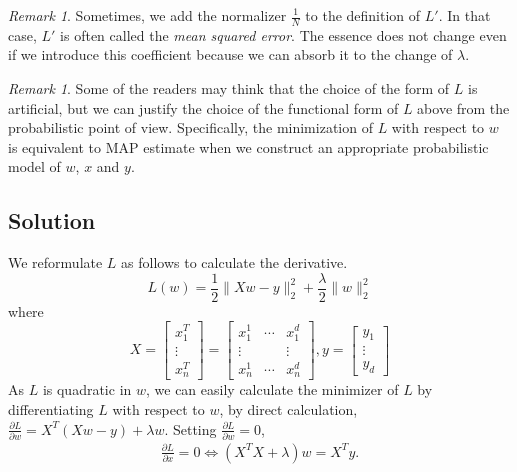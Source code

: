\documentclass{amsart}
\theoremstyle{definition}
\theoremstyle{remark}
\newtheorem{remark}[theorem]{Remark}
\numberwithin{equation}{section}
\begin{document}
\begin{remark}
Sometimes, we add the normalizer $\frac{1}{N}$ to the definition of $L'$.
In that case, $L'$ is often called the \textit{mean squared error}.
The essence does not change even if we introduce this coefficient because we can absorb it to the change of $\lambda$.
\end{remark}

\begin{remark}
Some of the readers may think that the choice of the form of $L$ is artificial,
but we can justify the choice of the functional form of $L$ above
from the probabilistic point of view.
Specifically, the minimization of $L$ with respect to $w$ is equivalent to
MAP estimate when we construct an appropriate probabilistic model of $w$, $x$ and $y$.
\end{remark}

\subsection{Solution}

We reformulate $L$ as follows to calculate the derivative.
\begin{equation}
L(w) = \frac{1}{2}\|Xw - y\|_2^2 + \frac{\lambda}{2} \|w\|_2^2
\end{equation}
where
\[
X =
\begin{bmatrix}
x_1^T\\
\vdots\\
x_n^T
\end{bmatrix}
=
\begin{bmatrix}
x_1^1 & \cdots & x_1^d\\
\vdots & & \vdots \\
x_n^1 & \cdots & x_n^d
\end{bmatrix}
, y = \begin{bmatrix}
y_1\\
\vdots\\
y_d
\end{bmatrix}
\]
As $L$ is quadratic in $w$, we can easily calculate the minimizer of $L$ by differentiating $L$ with respect to $w$,
by direct calculation, $\frac{\partial L}{\partial w} = X^T(Xw-y) + \lambda w$.
Setting $\frac{\partial L}{\partial w} = 0$,
\begin{equation}
\begin{split}
\frac{\partial L}{\partial x} = 0 \Leftrightarrow (X^TX+\lambda)w = X^T y.
\end{split}
\end{equation}
\end{document}
